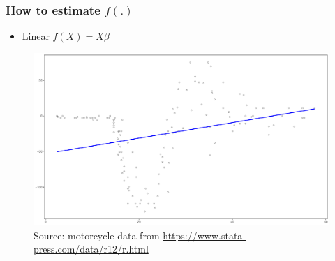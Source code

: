 \documentclass[
  shownotes,
  xcolor={svgnames},
  hyperref={colorlinks,citecolor=DarkBlue,linkcolor=DarkRed,urlcolor=DarkBlue}
  ]{beamer}
\begin{document}
\begin{frame}
\frametitle{How to estimate $f(.)$}


\begin{itemize}
  \item Linear $f(X)=X\beta$
\end{itemize}

\begin{figure}[H] \centering
  \centering
  \includegraphics[scale=0.25]{figures/fig_1b.pdf}
  \\
  \tiny
  Source: motorcycle data from \url{https://www.stata-press.com/data/r12/r.html}
\end{figure}

\end{frame}

\end{document}
